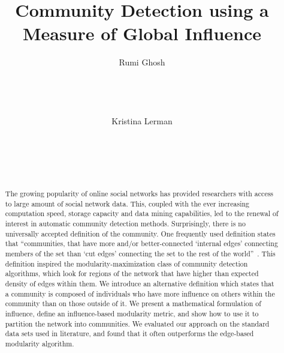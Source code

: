 \documentclass{sig-alternate}
\begin{document}
   

\title{Community Detection using a Measure of Global Influence}
\author{
\alignauthor
Rumi Ghosh\\
       \\
       \\
       \\
      \\
\alignauthor
Kristina Lerman\\
      \\
       \\
       \\
       \\
}

\maketitle 

\begin{abstract}
The growing popularity of online social networks has provided researchers with access to large amount of social network data. This, coupled  with the  ever increasing computation speed, storage capacity and data mining capabilities, led to the renewal of interest in automatic community detection methods. Surprisingly, there is no universally accepted definition of the community. 
One frequently used definition states that ``communities, that have more and/or better-connected `internal edges' connecting members of the set than `cut edges' connecting the set to the rest of the world''~\cite{Leskovec08www}.
This definition inspired the modularity-maximization class of community detection algorithms, which look for regions of the network that have higher than expected density of edges within them.
We introduce an alternative definition which states that a community is composed of individuals who have more influence on others within the community than on those outside of it.
We present a mathematical formulation of influence, define an influence-based modularity metric, and show how to use it to partition the network into communities. We evaluated our approach on the standard data sets used in literature, and found that it often outperforms the edge-based modularity algorithm.
\end{abstract}
\end{document}
